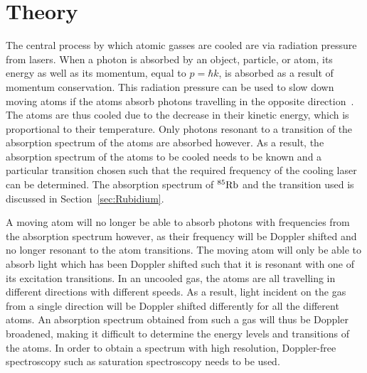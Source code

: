 \documentclass[twocolumn]{article}
\begin{document}
\section{Theory}
The central process by which atomic gasses are cooled are via radiation pressure from lasers. When a photon is absorbed by an object, particle, or atom, its energy as well as its momentum, equal to $p=\hbar k$, is absorbed as a result of momentum conservation. This radiation pressure can be used to slow down moving atoms if the atoms absorb photons travelling in the opposite direction~\cite{manual}. The atoms are thus cooled due to the decrease in their kinetic energy, which is proportional to their temperature. Only photons resonant to a transition of the absorption spectrum of the atoms are absorbed however. As a result, the absorption spectrum of the atoms to be cooled needs to be known and a particular transition chosen such that the required frequency of the cooling laser can be determined. The absorption spectrum of $^{85}\ce{Rb}$ and the transition used is discussed in Section~\ref{sec:Rubidium}. \\

\par A moving atom will no longer be able to absorb photons with frequencies from the absorption spectrum however, as their frequency will be Doppler shifted and no longer resonant to the atom transitions. The moving atom will only be able to absorb light which has been Doppler shifted such that it is resonant with one of its excitation transitions. In an uncooled gas, the atoms are all travelling in different directions with different speeds. As a result, light incident on the gas from a single direction will be Doppler shifted differently for all the different atoms. An absorption spectrum obtained from such a gas will thus be Doppler broadened, making it difficult to determine the energy levels and transitions of the atoms. In order to obtain a spectrum with high resolution, Doppler-free spectroscopy such as saturation spectroscopy needs to be used. 

\end{document}
